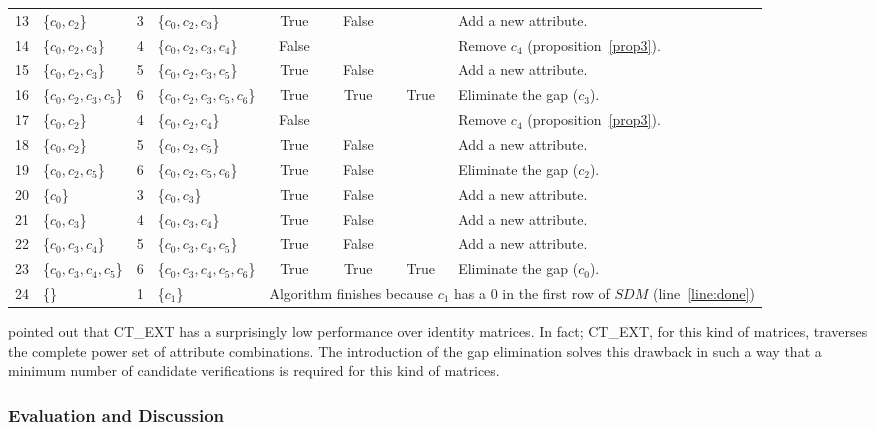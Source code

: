 \documentclass[authoryear,11pt]{elsarticle}
\begin{document}
\begin{table}[!htb]
\begin{tabular}{|c|l|c|l|c|c|c|l|}
    		13 & \{$c_0,c_2$\} 			& 3 & \{$c_0,c_2,c_3$\}			& True & False &   & Add a new attribute.\\
    		14 & \{$c_0,c_2,c_3$\} 		& 4 & \{$c_0,c_2,c_3,c_4$\}		& False &   &   & Remove $c_4$ (proposition~\ref{prop3}).\\
    		15 & \{$c_0,c_2,c_3$\}		& 5 & \{$c_0,c_2,c_3,c_5$\}		& True & False &   & Add a new attribute.\\
    		16 & \{$c_0,c_2,c_3,c_5$\}	& 6 & \{$c_0,c_2,c_3,c_5,c_6$\} 	& True & True & True & Eliminate the gap ($c_3$).\\
    		17 & \{$c_0,c_2$\} 			& 4 & \{$c_0,c_2,c_4$\}			& False &   &   & Remove $c_4$ (proposition~\ref{prop3}).\\
    		18 & \{$c_0,c_2$\}			& 5 & \{$c_0,c_2,c_5$\}			& True & False &   & Add a new attribute.\\
    		19 & \{$c_0,c_2,c_5$\}		& 6 & \{$c_0,c_2,c_5,c_6$\}		& True & False &   & Eliminate the gap ($c_2$).\\
    		20 & \{$c_0$\} 				& 3 & \{$c_0,c_3$\}				& True & False &   & Add a new attribute.\\    		
    		21 & \{$c_0,c_3$\}			& 4 & \{$c_0,c_3,c_4$\}			& True & False &   & Add a new attribute.\\
    		22 & \{$c_0,c_3,c_4$\}		& 5 & \{$c_0,c_3,c_4,c_5$\}		& True & False &   & Add a new attribute.\\
    		23 & \{$c_0,c_3,c_4,c_5$\}	& 6 & \{$c_0,c_3,c_4,c_5,c_6$\} 	& True & True & True & Eliminate the gap ($c_0$).\\
    		\hline
    		24 & \{\} 					& 1 & \{$c_1$\} 					& 
    		\multicolumn{4}{l|}{\scriptsize Algorithm finishes because $c_1$ has a 0 in the first row of $SDM$ (line~\ref{line:done})}\\
    		\hline
		\end{tabular}
	\end{table}
	
	\cite{Alba14} pointed out that CT\_EXT has a surprisingly low performance over identity matrices. 
	In fact; CT\_EXT, for this kind of matrices, traverses the complete power set of attribute combinations. 
	The introduction of the gap elimination solves this drawback in such a way that a minimum number of candidate 
	verifications is required for this kind of matrices.

\subsubsection{Evaluation and Discussion}
\end{document}

